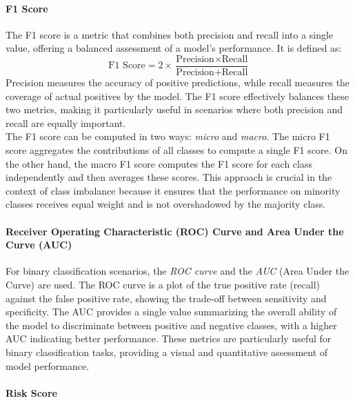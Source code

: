 \paragraph{F1 Score}
The F1 score is a metric that combines both precision and recall into a single value, offering a balanced assessment of a model's performance. It is defined as:
\[
    \text{F1 Score} = 2 \times \frac{\text{Precision} \times \text{Recall}}{\text{Precision} + \text{Recall}}
\]
Precision measures the accuracy of positive predictions, while recall measures the coverage of actual positives by the model.
The F1 score effectively balances these two metrics, making it particularly useful in scenarios where both precision and recall are equally important.\\
The F1 score can be computed in two ways: \textit{micro} and \textit{macro}.
The micro F1 score aggregates the contributions of all classes to compute a single F1 score.
On the other hand, the macro F1 score computes the F1 score for each class independently and then averages these scores.
This approach is crucial in the context of
class imbalance because it ensures that the performance on minority classes receives equal weight and is not overshadowed by the majority class.

\paragraph{Receiver Operating Characteristic (ROC) Curve and Area Under the Curve (AUC)}
For binary classification scenarios, the \textit{ROC curve} and the \textit{AUC} (Area Under the Curve) are used.
The ROC curve is a plot of the true positive rate (recall) against the false positive rate, showing the trade-off between sensitivity and specificity.
The AUC provides a single value summarizing the overall ability of the model to discriminate between positive and negative classes,
with a higher AUC indicating better performance. These metrics are particularly useful for binary classification tasks,
providing a visual and quantitative assessment of model performance.

\paragraph{Risk Score}

